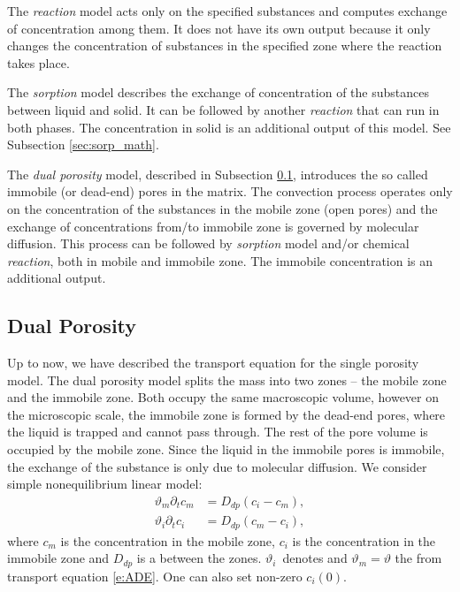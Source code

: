 The \emph{reaction} model acts only on the specified substances and computes exchange of concentration 
among them. It does not have its own output because it only changes the concentration of substances 
in the specified zone where the reaction takes place.

The \emph{sorption} model describes the exchange of concentration of the substances between liquid and solid. It can be
followed by another \emph{reaction} that can run in both phases. The concentration in solid is an additional output 
of this model. See Subsection \ref{sec:sorp_math}.


The \emph{dual porosity} model, described in Subsection \ref{sec:dual_porosity}, introduces the so called immobile (or dead-end) pores in the matrix. 
The convection process operates only on the concentration of the substances in the mobile zone (open pores) 
and the exchange of concentrations from/to immobile zone is governed by molecular diffusion. This process can be followed by 
\emph{sorption} model and/or chemical \emph{reaction}, both in mobile and immobile zone. The immobile concentration is an
additional output.


\subsection{Dual Porosity} 
\label{sec:dual_porosity}

Up to now, we have described the transport equation for the single porosity model. The dual porosity model splits the mass into 
two zones -- the mobile zone and the immobile zone. Both occupy the same macroscopic volume, however on the microscopic scale, 
the immobile zone is formed by the dead-end pores, where the liquid is trapped and cannot pass through. The rest of the pore volume 
is occupied by the mobile zone. Since the liquid in the immobile pores is immobile, the exchange of the substance is only due 
to molecular diffusion. We consider simple nonequilibrium linear model:
\begin{subequations}
\label{eq:odes_dual_por}
\begin{align}
    \vartheta_m \partial_t c_m &= D_{dp} ( c_i - c_m), \label{eqn:dual_porosity_ode1}\\
    \vartheta_i \partial_t c_i &= D_{dp} ( c_m - c_i), \label{eqn:dual_porosity_ode2}
\end{align}
\end{subequations}
where $c_m$ is the concentration in the mobile zone, $c_i$ is the concentration in the immobile zone and
$D_{dp}$ is a  between the zones.
$\vartheta_i$~denotes  and 
$\vartheta_m = \vartheta$ the  from 
transport equation \eqref{e:ADE}. One can also set non-zero  $c_i(0)$.

